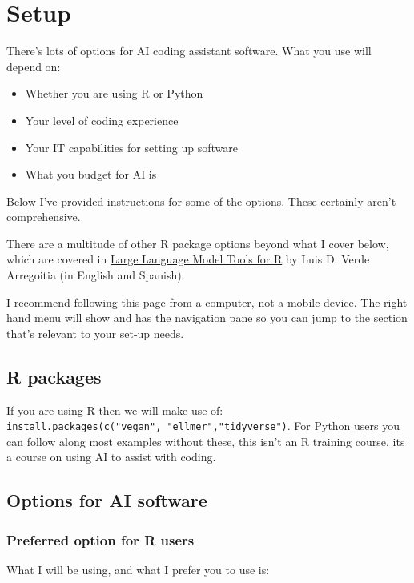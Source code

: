\documentclass[
  letterpaper,
  DIV=11,
  numbers=noendperiod]{scrreprt}
\providecommand{\tightlist}{%
  \setlength{\itemsep}{0pt}\setlength{\parskip}{0pt}}
\begin{document}
\chapter{Setup}\label{setup}

There's lots of options for AI coding assistant software. What you use
will depend on:

\begin{itemize}
\tightlist
\item
  Whether you are using R or Python
\item
  Your level of coding experience
\item
  Your IT capabilities for setting up software
\item
  What you budget for AI is
\end{itemize}

Below I've provided instructions for some of the options. These
certainly aren't comprehensive.

There are a multitude of other R package options beyond what I cover
below, which are covered in
\href{https://luisdva.github.io/llmsr-book/index.html}{Large Language
Model Tools for R} by Luis D. Verde Arregoitia (in English and Spanish).

I recommend following this page from a computer, not a mobile device.
The right hand menu will show and has the navigation pane so you can
jump to the section that's relevant to your set-up needs.

\section{R packages}\label{r-packages}

If you are using R then we will make use of:
\texttt{install.packages(c("vegan",\ "ellmer","tidyverse")}. For Python
users you can follow along most examples without these, this isn't an R
training course, its a course on using AI to assist with coding.

\section{Options for AI software}\label{options-for-ai-software}

\subsection{Preferred option for R
users}\label{preferred-option-for-r-users}

What I will be using, and what I prefer you to use is:
\end{document}
